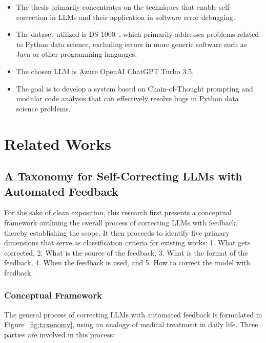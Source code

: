 \documentclass[a4paper,oneside]{book}
\begin{document}
\begin{itemize}
    \item The thesis primarily concentrates on the techniques that enable self-correction in LLMs and their application in software error debugging.

    \item The dataset utilized is DS-1000~\cite{pmlr-v202-lai23b}, which primarily addresses problems related to Python data science, excluding errors in more generic software such as Java or other programming languages.

    \item The chosen LLM is Azure OpenAI ChatGPT Turbo 3.5.

    \item The goal is to develop a system based on Chain-of-Thought prompting and modular code analysis that can effectively resolve bugs in Python data science problems.
\end{itemize}

\chapter{Related Works}

\section{A Taxonomy for Self-Correcting LLMs with Automated Feedback}
For the sake of clean exposition, this research first presents a conceptual framework outlining the overall process of correcting LLMs with feedback, thereby establishing the scope. It then proceeds to identify five primary dimensions that serve as classification criteria for existing works: 1. What gets corrected, 2. What is the source of the feedback, 3. What is the format of the feedback, 4. When the feedback is used, and 5. How to correct the model with feedback.

\subsection{Conceptual Framework}
The general process of correcting LLMs with automated feedback is formulated in Figure~\ref{fig:taxonomy}, using an analogy of medical treatment in daily life. Three parties are involved in this process:
\end{document}
